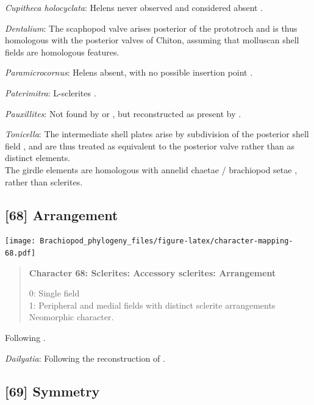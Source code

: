 \documentclass[openany]{book}
\begin{document}
\hypertarget{Cupitheca_holocyclata-coding-67}{}
\emph{Cupitheca holocyclata}: Helens never observed and considered
absent \citep{Skovsted2016}.

\hypertarget{Dentalium-coding-67}{}
\emph{Dentalium}: The scaphopod valve arises posterior of the prototroch
and is thus homologous with the posterior valves of Chiton, assuming
that molluscan shell fields are homologous features.

\hypertarget{Paramicrocornus-coding-67}{}
\emph{Paramicrocornus}: Helens absent, with no possible insertion point
\citep{Zhang2018Ahyolithid}.

\hypertarget{Paterimitra-coding-67}{}
\emph{Paterimitra}: L-sclerites \citep{Skovsted2009Thescleritome}.

\hypertarget{Pauxillites-coding-67}{}
\emph{Pauxillites}: Not found by \citet{Valent2015} or
\citet{Marek1966}, but reconstructed as present by \citet{Marek1976}.

\hypertarget{Tonicella-coding-67}{}
\emph{Tonicella}: The intermediate shell plates arise by subdivision of
the posterior shell field \citep{Wanninger2002C}, and are thus treated
as equivalent to the posterior valve rather than as distinct elements.\\
The girdle elements are homologous with annelid chaetae / brachiopod
setae \citep{Leise1982}, rather than sclerites.

\subsection*{{[}68{]} Arrangement}\label{arrangement}

\texttt{[image: Brachiopod\_phylogeny\_files/figure-latex/character-mapping-68.pdf]}

\begin{quote}
\textbf{Character 68: Sclerites: Accessory sclerites: Arrangement}

0: Single field\\
1: Peripheral and medial fields with distinct sclerite arrangements\\
Neomorphic character.
\end{quote}

Following \citet{Zhao2017}.

\hypertarget{Dailyatia-coding-68}{}
\emph{Dailyatia}: Following the reconstruction of
\citet{Skovsted2015Theearly}.

\subsection*{{[}69{]} Symmetry}\label{symmetry}
\end{document}
